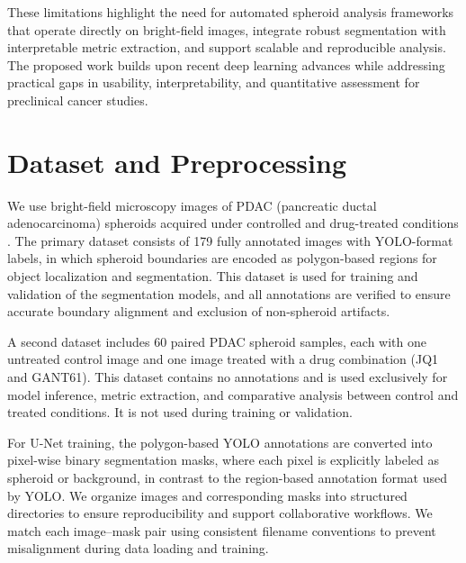 \documentclass[sigconf, nonacm]{acmart}
\begin{document}
These limitations highlight the need for automated spheroid analysis frameworks that operate directly on bright-field images, integrate robust segmentation with interpretable metric extraction, and support scalable and reproducible analysis. The proposed work builds upon recent deep learning advances while addressing practical gaps in usability, interpretability, and quantitative assessment for preclinical cancer studies.

\section{Dataset and Preprocessing}\label{dataprocessing}


We use bright-field microscopy images of PDAC (pancreatic ductal adenocarcinoma) spheroids acquired under controlled and drug-treated conditions \cite{ref10}. The primary dataset consists of 179 fully annotated images with YOLO-format labels, in which spheroid boundaries are encoded as polygon-based regions for object localization and segmentation. This dataset is used for training and validation of the segmentation models, and all annotations are verified to ensure accurate boundary alignment and exclusion of non-spheroid artifacts.

A second dataset includes 60 paired PDAC spheroid samples, each with one untreated control image and one image treated with a drug combination (JQ1 and GANT61). This dataset contains no annotations and is used exclusively for model inference, metric extraction, and comparative analysis between control and treated conditions. It is not used during training or validation.

For U-Net training, the polygon-based YOLO annotations are converted into pixel-wise binary segmentation masks, where each pixel is explicitly labeled as spheroid or background, in contrast to the region-based annotation format used by YOLO. We organize images and corresponding masks into structured directories to ensure reproducibility and support collaborative workflows. We match each image–mask pair using consistent filename conventions to prevent misalignment during data loading and training.
\end{document}
